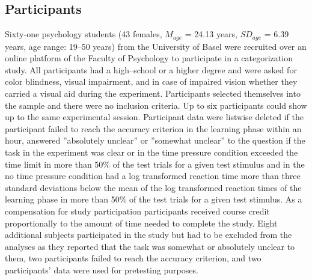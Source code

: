 \documentclass[a4paper,man,natbib]{apa6}
\begin{document}
\subsection{Participants}
Sixty-one psychology students (43 females, $M_{age}$ = 24.13 years, $SD_{age}$ = 6.39 years, age range: 19--50 years) from the University of Basel were recruited over an online platform of the Faculty of Psychology to participate in a categorization study. All participants had a high--school or a higher degree and were asked for color blindness, visual impairment, and in case of impaired vision whether they carried a visual aid during the experiment. Participants selected themselves into the sample and there were no inclusion criteria. Up to six participants could show up to the same experimental session. Participant data were listwise deleted if the participant failed to reach the accuracy criterion in the learning phase within an hour, answered ''absolutely unclear'' or ''somewhat unclear'' to the question if the task in the experiment was clear or in the time pressure condition exceeded the time limit in more than 50\% of the test trials for a given test stimulus and in the no time pressure condition had a log transformed reaction time more than three standard deviations below the mean of the log transformed reaction times of the learning phase in more than 50\% of the test trials for a given test stimulus.  As a compensation for study participation participants received course credit proportionally to the amount of time needed to complete the study. Eight additional subjects participated in the study but had to be excluded from the analyses as they reported that the task was somewhat or absolutely unclear to them, two participants failed to reach the accuracy criterion, and two participants' data were used for pretesting purposes.
\end{document}

